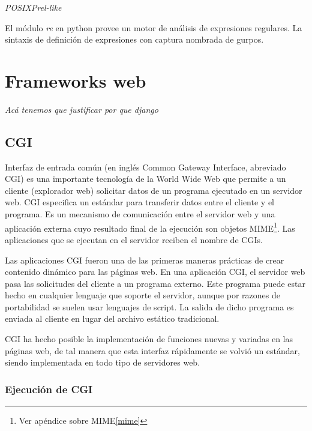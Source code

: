 \documentclass[a4paper]{report}
\begin{document}
\emph{POSIX}\emph{Prel-like}

El módulo \emph{re} en python provee un motor de análisis de expresiones
regulares.
La sintaxis de definición de expresiones con captura nombrada de gurpos.



\section{Frameworks web}
\emph{Acá tenemos que justificar por que django}
\subsection{CGI}
Interfaz de entrada común (en inglés Common Gateway Interface, abreviado CGI) es
una importante tecnología de la World Wide Web que permite a un cliente
(explorador web) solicitar datos de un programa ejecutado en un servidor web.
CGI especifica un estándar para transferir datos entre el cliente y el programa.
Es un mecanismo de comunicación entre el servidor web y una aplicación externa
cuyo resultado final de la ejecución son objetos MIME\footnote{Ver apéndice
sobre MIME\ref{mime}}.
Las aplicaciones que se ejecutan en el servidor reciben el nombre de CGIs.


Las aplicaciones CGI fueron una de las primeras maneras prácticas de crear
contenido dinámico para las páginas web. En una aplicación CGI, el servidor web
pasa las solicitudes del cliente a un programa externo. Este programa puede
estar hecho en cualquier lenguaje que soporte el servidor, aunque por razones de
portabilidad se suelen usar lenguajes de script. La salida de dicho programa es
enviada al cliente en lugar del archivo estático tradicional.

CGI ha hecho posible la implementación de funciones nuevas y variadas en las
páginas web, de tal manera que esta interfaz rápidamente se volvió un estándar,
siendo implementada en todo tipo de servidores web.
\subsubsection*{Ejecución de CGI}
\end{document}

